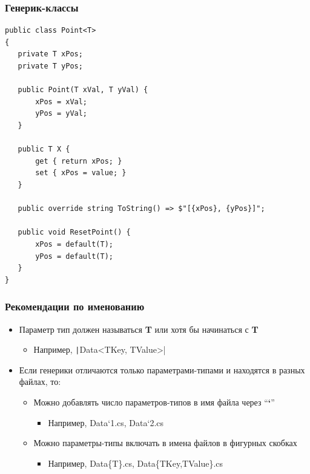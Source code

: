 \documentclass[xetex,mathserif,serif]{beamer}
\begin{document}
	\begin{frame}[fragile]
		\frametitle{Генерик-классы}
		\begin{scriptsize}
			\begin{verbatim}
public class Point<T>
{
   private T xPos;
   private T yPos;

   public Point(T xVal, T yVal) {
       xPos = xVal;
       yPos = yVal;
   }
   
   public T X {
       get { return xPos; }
       set { xPos = value; }
   }

   public override string ToString() => $"[{xPos}, {yPos}]";

   public void ResetPoint() {
       xPos = default(T);
       yPos = default(T);
   }
}
			\end{verbatim}
		\end{scriptsize}
	\end{frame}

	\begin{frame}
		\frametitle{Рекомендации по именованию}
		\begin{itemize}
			\item Параметр тип должен называться \textbf{T} или хотя бы начинаться с \textbf{T}
			\begin{itemize}
				\item Например, \texttt|Data<TKey, TValue>|
			\end{itemize}
			\item Если генерики отличаются только параметрами-типами и находятся в разных файлах, то:
			\begin{itemize}
				\item Можно добавлять число параметров-типов в имя файла через ``\textbf{`}''
				\begin{itemize}
					\item Например, Data`1.cs, Data`2.cs
				\end{itemize}
				\item Можно параметры-типы включать в имена файлов в фигурных скобках
				\begin{itemize}
					\item Например, Data\{T\}.cs, Data\{TKey,TValue\}.cs
				\end{itemize}
			\end{itemize}
		\end{itemize}
	\end{frame}
\end{document}
